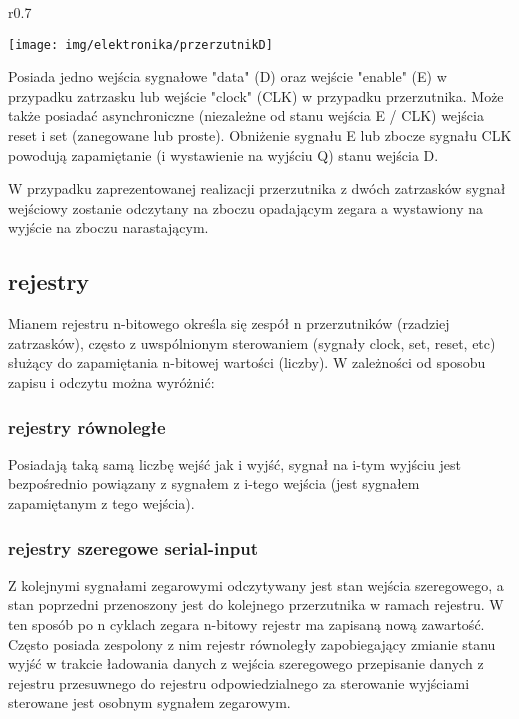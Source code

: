 \documentclass{pdfBooklets}
\begin{document}
\begin{wrapfigure}{r}{0.7\textwidth}
  \begin{center}
    \vspace{-25pt}
    \texttt{[image: img/elektronika/przerzutnikD]}
    \vspace{-25pt}
  \end{center}
\end{wrapfigure}

Posiada jedno wejścia sygnałowe "data" (D) oraz wejście "enable" (E) w przypadku zatrzasku lub wejście "clock" (CLK) w przypadku przerzutnika. Może także posiadać asynchroniczne (niezależne od stanu wejścia E / CLK) wejścia reset i set (zanegowane lub proste). Obniżenie sygnału E lub zbocze sygnału CLK powodują zapamiętanie (i wystawienie na wyjściu Q) stanu wejścia D.

W przypadku zaprezentowanej realizacji przerzutnika z dwóch zatrzasków sygnał wejściowy zostanie odczytany na zboczu opadającym zegara a wystawiony na wyjście na zboczu narastającym.

\subsection{rejestry}
Mianem rejestru n-bitowego określa się zespół n przerzutników (rzadziej zatrzasków), często z uwspólnionym sterowaniem (sygnały clock, set, reset, etc) służący do zapamiętania n-bitowej wartości (liczby). W zależności od sposobu zapisu i odczytu można wyróżnić:

\subsubsection{rejestry równoległe}
Posiadają taką samą liczbę wejść jak i wyjść, sygnał na i-tym wyjściu jest bezpośrednio powiązany z sygnałem z i-tego wejścia (jest sygnałem zapamiętanym z tego wejścia).
\subsubsection{rejestry szeregowe serial-input}
Z kolejnymi sygnałami zegarowymi odczytywany jest stan wejścia szeregowego, a stan poprzedni przenoszony jest do kolejnego przerzutnika w ramach rejestru. W ten sposób po n cyklach zegara n-bitowy rejestr ma zapisaną nową zawartość. Często posiada zespolony z nim rejestr równoległy zapobiegający zmianie stanu wyjść w trakcie ładowania danych z wejścia szeregowego przepisanie danych z rejestru przesuwnego do rejestru odpowiedzialnego za sterowanie wyjściami sterowane jest osobnym sygnałem zegarowym.
\end{document}
